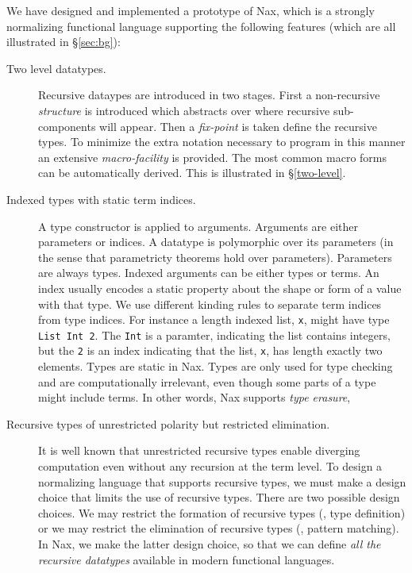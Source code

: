 We have designed and implemented a prototype of Nax, which is
a strongly normalizing functional language supporting the following features
(which are all illustrated in \S\ref{sec:bg}):
\begin{description}

\item[Two level datatypes.]
Recursive dataypes are introduced in two stages. First a non-recursive
{\em structure} is introduced which abstracts over where recursive 
sub-components will appear. Then a {\em fix-point} is taken define
the recursive types. To minimize the extra notation necessary to program
in this manner an extensive {\em macro-facility} is provided. The most common
macro forms can be automatically derived. This is illustrated in \S\ref{two-level}.

\item[Indexed types with static term indices.]
A type constructor is applied to arguments. Arguments
are either parameters or indices. A datatype is polymorphic over
its parameters (in the sense that parametricty theorems hold over parameters).
Parameters are always types.
Indexed arguments can be either types or terms. An index usually
encodes a static property about the shape or form of a value with
that type. We use different kinding rules to separate
term indices from type indices. For instance a length indexed list, \verb+x+,
might have type \verb+List Int 2+. The \verb+Int+ is a paramter, indicating
the list contains integers, but the \verb+2+ is an index indicating
that the list, \verb+x+, has length exactly two elements.  
Types are static in Nax. Types are only used for type checking
and are computationally irrelevant, even though some parts of a type might include terms.
In other words, Nax supports \emph{type erasure},

\item[Recursive types of unrestricted polarity but restricted elimination.]
It is well known that unrestricted recursive types enable diverging computation
even without any recursion at the term level. To design a normalizing language
that supports recursive types, we must make a design choice that limits
the use of recursive types. There are two possible
design choices. We may restrict the formation of recursive types
(\ie, type definition) or we may restrict the elimination of recursive types
(\ie, pattern matching). In Nax, we make the latter design choice, so that we can
define \emph{all the recursive datatypes} available in modern functional languages.


\end{description}
